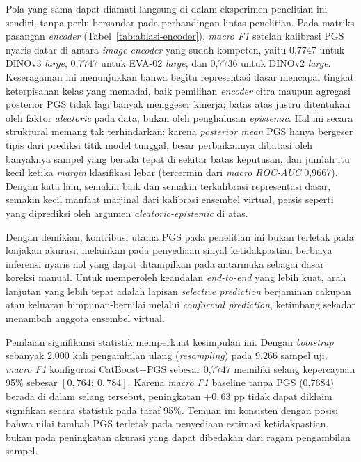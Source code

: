 Pola yang sama dapat diamati langsung di dalam eksperimen penelitian ini sendiri, tanpa perlu bersandar pada perbandingan lintas-penelitian. Pada matriks pasangan \textit{encoder} (Tabel~\ref{tab:ablasi-encoder}), \textit{macro F1} setelah kalibrasi PGS nyaris datar di antara \textit{image encoder} yang sudah kompeten, yaitu 0,7747 untuk DINOv3 \textit{large}, 0,7747 untuk EVA-02 \textit{large}, dan 0,7736 untuk DINOv2 \textit{large}. Keseragaman ini menunjukkan bahwa begitu representasi dasar mencapai tingkat keterpisahan kelas yang memadai, baik pemilihan \textit{encoder} citra maupun agregasi posterior PGS tidak lagi banyak menggeser kinerja; batas atas justru ditentukan oleh faktor \textit{aleatoric} pada data, bukan oleh penghalusan \textit{epistemic}. Hal ini secara struktural memang tak terhindarkan: karena \textit{posterior mean} PGS hanya bergeser tipis dari prediksi titik model tunggal, besar perbaikannya dibatasi oleh banyaknya sampel yang berada tepat di sekitar batas keputusan, dan jumlah itu kecil ketika \textit{margin} klasifikasi lebar (tercermin dari \textit{macro ROC-AUC} 0,9667). Dengan kata lain, semakin baik dan semakin terkalibrasi representasi dasar, semakin kecil manfaat marjinal dari kalibrasi ensembel virtual, persis seperti yang diprediksi oleh argumen \textit{aleatoric-epistemic} di atas.

Dengan demikian, kontribusi utama PGS pada penelitian ini bukan terletak pada lonjakan akurasi, melainkan pada penyediaan sinyal ketidakpastian berbiaya inferensi nyaris nol yang dapat ditampilkan pada antarmuka sebagai dasar koreksi manual. Untuk memperoleh keandalan \textit{end-to-end} yang lebih kuat, arah lanjutan yang lebih tepat adalah lapisan \textit{selective prediction} berjaminan cakupan atau keluaran himpunan-bernilai melalui \textit{conformal prediction}, ketimbang sekadar menambah anggota ensembel virtual.

Penilaian signifikansi statistik memperkuat kesimpulan ini. Dengan \textit{bootstrap} sebanyak 2.000 kali pengambilan ulang (\textit{resampling}) pada 9.266 sampel uji, \textit{macro F1} konfigurasi CatBoost+PGS sebesar 0,7747 memiliki selang kepercayaan 95\% sebesar $[0{,}764;\ 0{,}784]$. Karena \textit{macro F1} baseline tanpa PGS (0,7684) berada di dalam selang tersebut, peningkatan $+0{,}63$ pp tidak dapat diklaim signifikan secara statistik pada taraf 95\%. Temuan ini konsisten dengan posisi bahwa nilai tambah PGS terletak pada penyediaan estimasi ketidakpastian, bukan pada peningkatan akurasi yang dapat dibedakan dari ragam pengambilan sampel.

